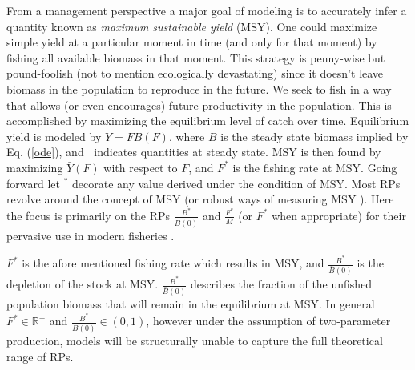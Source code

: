 \documentclass[12pt]{ucscthesis}
\begin{document}
From a management perspective a major goal of modeling is to accurately infer
a quantity known as \emph{maximum sustainable yield} (MSY). One could maximize
simple yield at a particular moment in time (and only for that moment) by
fishing all available biomass in that moment. This strategy is penny-wise but
pound-foolish (not to mention ecologically devastating) since it doesn't leave
biomass in the population to reproduce in the future. We seek to fish in a way
that allows (or even encourages) future productivity in the population. This is
accomplished by maximizing the equilibrium level of catch over time.
Equilibrium yield is modeled by $\bar Y = F\bar B(F)$, where $\bar B$ is the 
steady state biomass implied by Eq. (\ref{ode}), and $\bar~$ indicates quantities 
at steady state. 
MSY is then found by maximizing $\bar Y(F)$ with respect to $F$, and $F^*$ is 
the fishing rate at MSY. Going forward let $^*$ decorate any value derived 
under the condition of MSY.
Most RPs revolve around the concept of MSY (or robust ways of measuring MSY \cite{hilborn_pretty_2010,punt_management_2016}).
Here the focus is primarily on the RPs $\frac{B^*}{\bar B(0)}$ and $\frac{F^*}{M}$ (or $F^*$ when appropriate)
for their pervasive use in modern fisheries \cite{punt_extending_2019}. %


%
$F^*$ is the afore mentioned fishing rate which results in MSY, and $\frac{B^*}{\bar B(0)}$
is the depletion of the stock at MSY. %
$\frac{B^*}{\bar B(0)}$ describes
the fraction of the unfished population biomass that will remain in the equilibrium
at MSY. In general $F^*\in\mathbb{R}^+$ and \mbox{$\frac{B^*}{\bar B(0)}\in\left(0, 1\right)$,}
however under the assumption of two-parameter production, %
models will be structurally unable to capture the full theoretical range of RPs.
\end{document}
